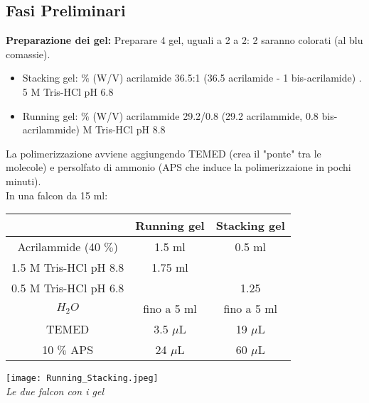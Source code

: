 \documentclass{extarticle}
\begin{document}
\subsection*{Fasi Preliminari}
\textbf{Preparazione dei gel:}
Preparare 4 gel, uguali a 2 a 2: 2 saranno colorati (al blu comassie).
\begin{itemize}
    \item Stacking gel:
        $\%$ (W/V) acrilamide 36.5:1 (36.5 acrilamide - 1 bis-acrilamide)
        . 5 M Tris-HCl pH 6.8
    \item Running gel:
        $\%$ (W/V) acrilammide 29.2/0.8 (29.2 acrilammide, 0.8 bis-acrilammide)
         M Tris-HCl pH 8.8
\end{itemize}
\begin{minipage}[c]{0.5\textwidth}
    La polimerizzazione avviene aggiungendo TEMED (crea il "ponte" tra le molecole) e persolfato di ammonio (APS che induce la polimerizzaione in pochi minuti).\\
    In una falcon da 15 ml:
    \begin{center}
        \begin{tabular}{ccc}
            \toprule
            & Running gel & Stacking gel\\
            \midrule
            Acrilammide (40 $\%$) & 1.5 ml & 0.5 ml\\
            1.5 M Tris-HCl pH 8.8 & 1.75 ml & \\
            0.5 M Tris-HCl pH 6.8 & & 1.25\\
            $H_{2}O$ & fino a 5 ml & fino a 5 ml\\
            TEMED & 3.5 $\mu$L & 19 $\mu$L\\
            10 $\%$ APS & 24 $\mu$L & 60 $\mu$L\\
            \bottomrule
        \end{tabular}
    \end{center}
\end{minipage} \hfill
\begin{minipage}[c]{0.5\textwidth}
    \begin{center}
        \texttt{[image: Running\_Stacking.jpeg]}\\
        \emph{Le due falcon con i gel}
    \end{center}
\end{minipage}
\end{document}
